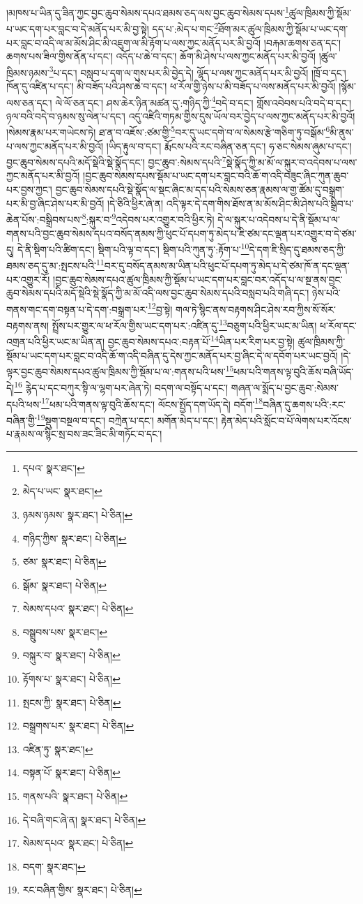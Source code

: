 །མཁས་པ་ཡིན་དུ་ཟིན་ཀྱང་བྱང་ཆུབ་སེམས་དཔའ་ཐམས་ཅད་ལས་བྱང་ཆུབ་སེམས་དཔས་\footnote{དཔའ་  སྣར་ཐང་། }ཚུལ་ཁྲིམས་ཀྱི་སྡོམ་པ་ཡང་དག་པར་བླང་བ་དེ་མནོད་པར་མི་བྱ་སྟེ། དད་པ་:མེད་པ་གང་\footnote{མེད་པ་ཡང་  སྣར་ཐང་། }ཐོག་མར་ཚུལ་ཁྲིམས་ཀྱི་སྡོམ་པ་ཡང་དག་པར་བླང་བ་འདི་ལ་མ་མོས་ཤིང་མི་འཇུག་ལ་མི་རྟོག་པ་ལས་ཀྱང་མནོད་པར་མི་བྱའོ། །བརྐམ་ཆགས་ཅན་དང་། ཆགས་པས་ཟིལ་གྱིས་ནོན་པ་དང་། འདོད་པ་ཆེ་བ་དང་། ཆོག་མི་ཤེས་པ་ལས་ཀྱང་མནོད་པར་མི་བྱའོ། །ཚུལ་ཁྲིམས་ཉམས་\footnote{ཉམས་ཉམས་  སྣར་ཐང་།  པེ་ཅིན། }པ་དང་། བསླབ་པ་དག་ལ་གུས་པར་མི་བྱེད་དེ། ལྷོད་པ་ལས་ཀྱང་མནོད་པར་མི་བྱའོ། །ཁྲོ་བ་དང་། ཁོན་དུ་འཛིན་པ་དང་། མི་བཟོད་པའི་ཤས་ཆེ་བ་དང་། ཕ་རོལ་གྱི་ཉེས་པ་མི་བཟོད་པ་ལས་མནོད་པར་མི་བྱའོ། །སྙོམ་ལས་ཅན་དང་། ལེ་ལོ་ཅན་དང་། ཤས་ཆེར་ཉིན་མཚན་དུ་:གཉིད་ཀྱི་\footnote{གཉིད་ཀྱིས་  སྣར་ཐང་།  པེ་ཅིན། }བདེ་བ་དང་། གློས་འབེབས་པའི་བདེ་བ་དང་། ཉལ་བའི་བདེ་བ་ཉམས་སུ་ལེན་པ་དང་། འདུ་འཛིའི་གཏམ་གྱིས་དུས་ཡོལ་བར་བྱེད་པ་ལས་ཀྱང་མནོད་པར་མི་བྱའོ། །སེམས་རྣམ་པར་གཡེངས་ཏེ། ཐ་ན་བ་འཇོས་:ཙམ་གྱི་\footnote{ཙམ་  སྣར་ཐང་།  པེ་ཅིན། }བར་དུ་ཡང་དགེ་བ་ལ་སེམས་རྩེ་གཅིག་ཏུ་བསྒོམ་\footnote{སྒོམ་  སྣར་ཐང་།  པེ་ཅིན། }མི་ནུས་པ་ལས་ཀྱང་མནོད་པར་མི་བྱའོ། །ཡིད་རྟུལ་བ་དང་། རྨོངས་པའི་རང་བཞིན་ཅན་དང་། ཧ་ཅང་སེམས་ཞུམ་པ་དང་། བྱང་ཆུབ་སེམས་དཔའི་མདོ་སྡེའི་སྡེ་སྣོད་དང་། བྱང་ཆུབ་:སེམས་དཔའི་\footnote{སེམས་དཔའ་  སྣར་ཐང་།  པེ་ཅིན། }སྡེ་སྣོད་ཀྱི་མ་མོ་ལ་སྐུར་བ་འདེབས་པ་ལས་ཀྱང་མནོད་པར་མི་བྱའོ། །བྱང་ཆུབ་སེམས་དཔས་སྡོམ་པ་ཡང་དག་པར་བླང་བའི་ཆོ་ག་འདི་བཟུང་ཞིང་ཀུན་ཆུབ་པར་བྱས་ཀྱང་། བྱང་ཆུབ་སེམས་དཔའི་སྡེ་སྣོད་ལ་སྡང་ཞིང་མ་དད་པའི་སེམས་ཅན་རྣམས་ལ་གྱ་ཚོམ་དུ་བསྒྲག་པར་མི་བྱ་ཞིང་ཤེས་པར་མི་བྱའོ། །དེ་ཅིའི་ཕྱིར་ཞེ་ན། འདི་ལྟར་དེ་དག་གིས་ཐོས་ན་མ་མོས་ཤིང་མི་ཤེས་པའི་སྒྲིབ་པ་ཆེན་པོས་:བསྒྲིབས་པས་\footnote{བསྒྲུབས་པས་  སྣར་ཐང་། }:སྐུར་བ་\footnote{བསྐུར་བ་  སྣར་ཐང་།  པེ་ཅིན། }འདེབས་པར་འགྱུར་བའི་ཕྱིར་ཏེ། དེ་ལ་སྐུར་པ་འདེབས་པ་དེ་ནི་སྡོམ་པ་ལ་གནས་པའི་བྱང་ཆུབ་སེམས་དཔའ་བསོད་ནམས་ཀྱི་ཕུང་པོ་དཔག་ཏུ་མེད་པ་ཇི་ཙམ་དང་ལྡན་པར་འགྱུར་བ་དེ་ཙམ་དུ། དེ་ནི་སྡིག་པའི་ཚིག་དང་། སྡིག་པའི་ལྟ་བ་དང་། སྡིག་པའི་ཀུན་ཏུ་:རྟོག་པ་\footnote{རྟོགས་པ་  སྣར་ཐང་།  པེ་ཅིན། }དེ་དག་ཇི་སྲིད་དུ་ཐམས་ཅད་ཀྱི་ཐམས་ཅད་དུ་མ་:སྤངས་པའི་\footnote{སྤངས་ཀྱི་  སྣར་ཐང་།  པེ་ཅིན། }བར་དུ་བསོད་ནམས་མ་ཡིན་པའི་ཕུང་པོ་དཔག་ཏུ་མེད་པ་དེ་ཙམ་ཁོ་ན་དང་ལྡན་པར་འགྱུར་རོ། །བྱང་ཆུབ་སེམས་དཔའ་ཚུལ་ཁྲིམས་ཀྱི་སྡོམ་པ་ཡང་དག་པར་བླང་བར་འདོད་པ་ལ་སྔ་ནས་བྱང་ཆུབ་སེམས་དཔའི་མདོ་སྡེའི་སྡེ་སྣོད་ཀྱི་མ་མོ་འདི་ལས་བྱང་ཆུབ་སེམས་དཔའི་བསླབ་པའི་གཞི་དང་། ཉེས་པའི་གནས་གང་དག་བསྟན་པ་དེ་དག་:བསྒྲག་པར་\footnote{བསྒྲགས་པར་  སྣར་ཐང་།  པེ་ཅིན། }བྱ་སྟེ། གལ་ཏེ་སྙིང་ནས་བརྟགས་ཤིང་ཤེས་རབ་ཀྱིས་སོ་སོར་བརྟགས་ནས། སྤྲོས་པར་གྱུར་ལ་ཕ་རོལ་གྱིས་ཡང་དག་པར་:འཛིན་དུ་\footnote{འཛིན་ཏུ་  སྣར་ཐང་། }བཅུག་པའི་ཕྱིར་ཡང་མ་ཡིན། ཕ་རོལ་དང་འགྲན་པའི་ཕྱིར་ཡང་མ་ཡིན་ན། བྱང་ཆུབ་སེམས་དཔའ་:བརྟན་པོ་\footnote{བསྟན་པོ་  སྣར་ཐང་།  པེ་ཅིན། }ཡིན་པར་རིག་པར་བྱ་སྟེ། ཚུལ་ཁྲིམས་ཀྱི་སྡོམ་པ་ཡང་དག་པར་བླང་བ་འདི་ཆོ་ག་འདི་བཞིན་དུ་དེས་ཀྱང་མནོད་པར་བྱ་ཞིང་དེ་ལ་དབོག་པར་ཡང་བྱའོ། །དེ་ལྟར་བྱང་ཆུབ་སེམས་དཔའ་ཚུལ་ཁྲིམས་ཀྱི་སྡོམ་པ་ལ་:གནས་པའི་ཕས་\footnote{གནས་པའི་  སྣར་ཐང་།  པེ་ཅིན། }ཕམ་པའི་གནས་ལྟ་བུའི་ཆོས་བཞི་ཡོད་དེ།\footnote{དེ་བཞི་གང་ཞེ་ན།  སྣར་ཐང་།  པེ་ཅིན། } རྙེད་པ་དང་བཀུར་སྟི་ལ་ལྷག་པར་ཞེན་ཏེ། བདག་ལ་བསྟོད་པ་དང་། གཞན་ལ་སྨོད་པ་བྱང་ཆུབ་:སེམས་དཔའི་ཕས་\footnote{སེམས་དཔའ་  སྣར་ཐང་།  པེ་ཅིན། }ཕམ་པའི་གནས་ལྟ་བུའི་ཆོས་དང་། ལོངས་སྤྱོད་དག་ཡོད་དེ། བདོག་\footnote{བདག་  སྣར་ཐང་། }བཞིན་དུ་ཆགས་པའི་:རང་བཞིན་གྱི་\footnote{རང་བཞིན་གྱིས་  སྣར་ཐང་།  པེ་ཅིན། }སྡུག་བསྔལ་བ་དང་། བཀྲེན་པ་དང་། མགོན་མེད་པ་དང་། རྟེན་མེད་པའི་སློང་བ་པོ་ལེགས་པར་འོངས་པ་རྣམས་ལ་སྙིང་སྲ་བས་ཟང་ཟིང་མི་གཏོང་བ་དང་། 